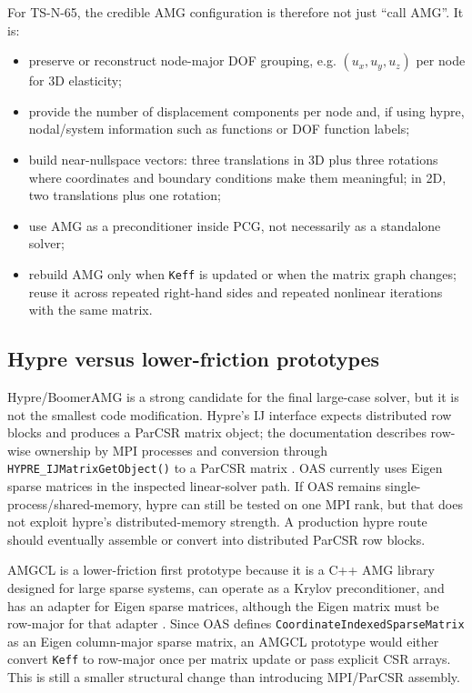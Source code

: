 \documentclass[10pt,a4paper]{article}
\newcommand{\code}[1]{\texttt{#1}}
\begin{document}
For TS-N-65, the credible AMG configuration is therefore not just ``call AMG''. It is:
\begin{itemize}
  \item preserve or reconstruct node-major DOF grouping, e.g. $(u_x,u_y,u_z)$ per node for 3D elasticity;
  \item provide the number of displacement components per node and, if using hypre, nodal/system information such as functions or DOF function labels;
  \item build near-nullspace vectors: three translations in 3D plus three rotations where coordinates and boundary conditions make them meaningful; in 2D, two translations plus one rotation;
  \item use AMG as a preconditioner inside PCG, not necessarily as a standalone solver;
  \item rebuild AMG only when \code{Keff} is updated or when the matrix graph changes; reuse it across repeated right-hand sides and repeated nonlinear iterations with the same matrix.
\end{itemize}

\subsection*{Hypre versus lower-friction prototypes}

Hypre/BoomerAMG is a strong candidate for the final large-case solver, but it is not the smallest code modification. Hypre's IJ interface expects distributed row blocks and produces a ParCSR matrix object; the documentation describes row-wise ownership by MPI processes and conversion through \code{HYPRE\_IJMatrixGetObject()} to a ParCSR matrix \cite{hypreij,hypreparcsr}. OAS currently uses Eigen sparse matrices in the inspected linear-solver path. If OAS remains single-process/shared-memory, hypre can still be tested on one MPI rank, but that does not exploit hypre's distributed-memory strength. A production hypre route should eventually assemble or convert into distributed ParCSR row blocks.

AMGCL is a lower-friction first prototype because it is a C++ AMG library designed for large sparse systems, can operate as a Krylov preconditioner, and has an adapter for Eigen sparse matrices, although the Eigen matrix must be row-major for that adapter \cite{amgcl,amgcladapter}. Since OAS defines \code{CoordinateIndexedSparseMatrix} as an Eigen column-major sparse matrix, an AMGCL prototype would either convert \code{Keff} to row-major once per matrix update or pass explicit CSR arrays. This is still a smaller structural change than introducing MPI/ParCSR assembly.
\end{document}
